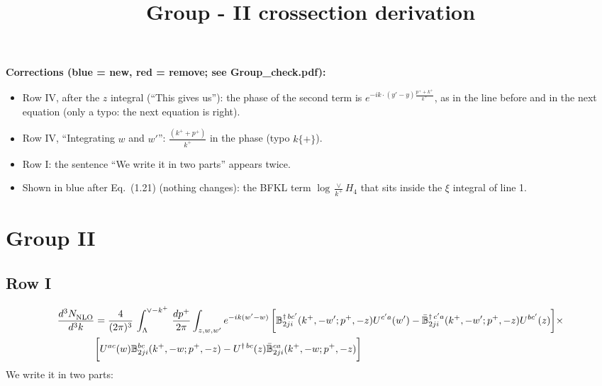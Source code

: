 \documentclass[9pt]{article}
\title{Group - II crossection derivation}
\author{}
\date{}
\def\mf#1{\mathbb{#1}}
\numberwithin{equation}{section}
\begin{document}
\maketitle
{\color{blue}\noindent\textbf{Corrections (blue = new, red = remove; see Group\_check.pdf):}
\begin{itemize}
\item Row IV, after the $z$ integral (``This gives us''): the phase of the second term is $e^{-ik\cdot(y'-y)\frac{p^++k^+}{k^+}}$, as in the line before and in the next equation (only a typo: the next equation is right).
\item Row IV, ``Integrating $w$ and $w'$'': $\frac{(k^++p^+)}{k^+}$ in the phase (typo $k\{+\}$).
\item Row I: the sentence ``We write it in two parts'' appears twice.
\item Shown in blue after Eq.~(1.21) (nothing changes): the BFKL term $\log\frac{\vee}{k^+}H_4$ that sits inside the $\xi$ integral of line 1.
\end{itemize}}

\section{Group II}
\subsection{Row I\,}
\begin{align}
    \frac{d^{3}N_{\rm NLO}^{\rm}}{d^{3}k}  & = \frac{4}{(2\pi)^{3}}\,\int_{\Lambda}^{\vee-k^{+}}\, \frac{dp^{+}}{2\pi}\int_{z,w,w^{\prime}} e^{-ik(w^{\prime}-w)}\, \bigg[\mf{B}^{\dagger\, bc^{\prime}}_{2ji}(k^{+},-w^{\prime};p^{+},-z)U^{ c^{\prime}a}(w^{\prime}) -\Bar{\mf{B}}^{\dagger\, c^{\prime}a}_{2ji}(k^{+},-w^{\prime}; p^{+},-z)U^{bc^{\prime}}(z)\bigg]\times\notag \\ & \bigg[U^{ac}(w) \mf{B}^{bc}_{2ji}(k^{+},-w;p^{+},-z) -U^{\dagger\, bc}(z)\Bar{\mf{B}}^{ca}_{2ji}(k^{+},-w; p^{+},-z)\bigg]\nonumber
\end{align}
We write it in two parts: 
\end{document}
